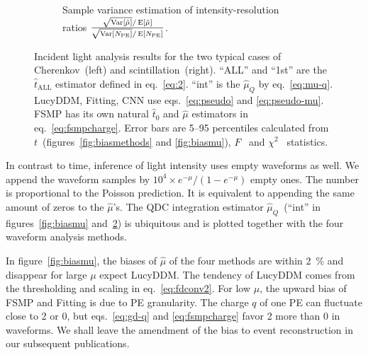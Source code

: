 \begin{figure}[H]
  \vspace{0.5em}
  \begin{subfigure}[b]{\textwidth}
    \centering
    \resizebox{0.99\textwidth}{!}{}
    \vspace{-0.5em}
    \caption{\label{fig:deltamu} Sample variance estimation of intensity-resolution ratios $\frac{\sqrt{\operatorname{Var}[\hat{\mu}]} / \operatorname{E}[\hat{\mu}]}{\sqrt{\operatorname{Var}[N_\mathrm{PE}]} / \operatorname{E}[N_\mathrm{PE}]}$.}
  \end{subfigure}
  \caption{Incident light analysis results for the two typical cases of Cherenkov~(left) and scintillation~(right).  ``ALL'' and ``1st'' are the $\hat{t}_\mathrm{ALL}$ estimator defined in eq.~\eqref{eq:2}. ``int'' is the $\hat{\mu}_Q$ by eq.~\eqref{eq:mu-q}.  LucyDDM, Fitting, CNN use eqs.~\eqref{eq:pseudo} and \eqref{eq:pseudo-mu}.  FSMP has its own natural $\hat{t}_0$ and $\hat{\mu}$ estimators in eq.~\eqref{eq:fsmpcharge}. Error bars are 5--95 percentiles calculated from $t$~(figures~\ref{fig:biasmethods} and \ref{fig:biasmu}), $F$~ and $\chi^2$~ statistics.}
\end{figure}

In contrast to time, inference of light intensity uses empty waveforms as well.  We append the waveform samples by $10^4 \times e^{-\mu} / (1-e^{-\mu})$ empty ones.  The number is proportional to the Poisson prediction.  It is equivalent to appending the same amount of zeros to the $\hat{\mu}$'s. The QDC integration estimator $\hat{\mu}_Q$~(``int'' in figures~\ref{fig:biasmu} and~\ref{fig:deltamu}) is ubiquitous and is plotted together with the four waveform analysis methods.

In figure~\ref{fig:biasmu}, the biases of $\hat{\mu}$ of the four methods are within \SI{2}{\percent} and disappear for large $\mu$ expect LucyDDM.  The tendency of LucyDDM comes from the thresholding and scaling in eq.~\eqref{eq:fdconv2}.  For low $\mu$, the upward bias of FSMP and Fitting is due to PE granularity.  The charge $q$ of one PE can fluctuate close to 2 or 0, but eqs.~\eqref{eq:gd-q} and \eqref{eq:fsmpcharge} favor 2 more than 0 in waveforms.  We shall leave the amendment of the bias to event reconstruction in our subsequent publications.

